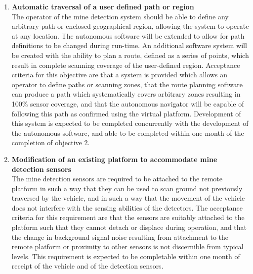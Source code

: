\documentclass[main.tex]{subfiles}
\begin{document}
\begin{enumerate}
\item \textbf{Automatic traversal of a user defined path or region}\\ 
The operator of the mine detection system should be able to define any arbitrary path or enclosed geographical region, allowing the system to operate at any location. 
The autonomous software will be extended to allow for path definitions to be changed during run-time. 
An additional software system will be created with the ability to plan a route, defined as a series of points, which result in complete scanning coverage of the user-defined region.
Acceptance criteria for this objective are that a system is provided which allows an operator to define paths or scanning zones, that the route planning software can produce a path which systematically covers arbitrary zones resulting in 100\% sensor coverage, and that the autonomous navigator will be capable of following this path as confirmed using the virtual platform.
Development of this system is expected to be completed concurrently with the development of the autonomous software, and able to be completed within one month of the completion of objective 2.

\item \textbf{Modification of an existing platform to accommodate mine detection sensors}\\ 
The mine detection sensors are required to be attached to the remote platform in such a way that they can be used to scan ground not previously traversed by the vehicle, and in such a way that the movement of the vehicle does not interfere with the sensing abilities of the detectors. 
The acceptance criteria for this requirement are that the sensors are suitably attached to the platform such that they cannot detach or displace during operation, and that the change in background signal noise resulting from attachment to the remote platform or proximity to other sensors is not discernible from typical levels. 
This requirement is expected to be completable within one month of receipt of the vehicle and of the detection sensors.


\end{enumerate}
\end{document}
